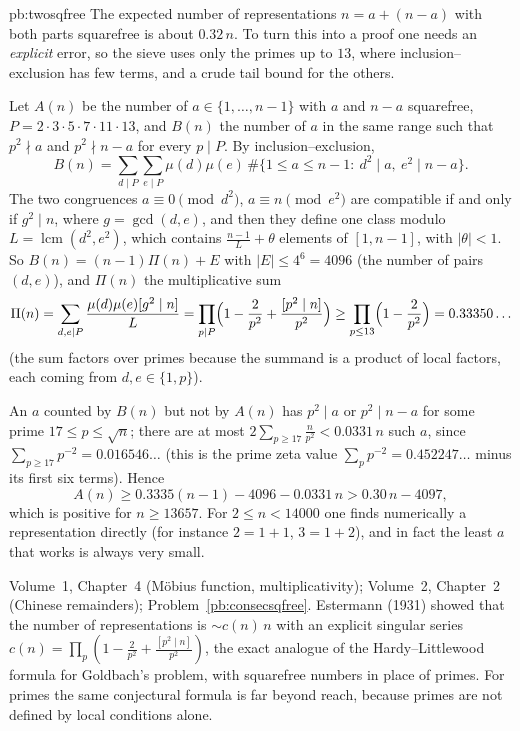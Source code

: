 \begin{solution}{pb:twosqfree}
\idea The expected number of representations $n=a+(n-a)$ with both parts squarefree is about $0.32\,n$. To turn this into a
proof one needs an \emph{explicit} error, so the sieve uses only the primes up to $13$, where inclusion--exclusion has few terms,
and a crude tail bound for the others.

\writeup Let $A(n)$ be the number of $a\in\{1,\dots,n-1\}$ with $a$ and $n-a$ squarefree, $P=2\cdot3\cdot5\cdot7\cdot11\cdot13$, and
$B(n)$ the number of $a$ in the same range such that $p^2\nmid a$ and $p^2\nmid n-a$ for every $p\mid P$. By inclusion--exclusion,
\[
B(n)=\sum_{d\mid P}\sum_{e\mid P}\mu(d)\mu(e)\,\#\{1\le a\le n-1:\ d^2\mid a,\ e^2\mid n-a\}.
\]
The two congruences $a\equiv0\pmod{d^2}$, $a\equiv n\pmod{e^2}$ are compatible if and only if $g^2\mid n$, where $g=\gcd(d,e)$, and
then they define one class modulo $L=\operatorname{lcm}(d^2,e^2)$, which contains $\frac{n-1}L+\theta$ elements of $[1,n-1]$, with
$|\theta|<1$. So $B(n)=(n-1)\Pi(n)+E$ with $|E|\le4^6=4096$ (the number of pairs $(d,e)$), and $\Pi(n)$ the multiplicative sum
\[
\Pi(n)=\sum_{d,e\mid P}\frac{\mu(d)\mu(e)[g^2\mid n]}L=\prod_{p\mid P}\Bigl(1-\frac2{p^2}+\frac{[p^2\mid n]}{p^2}\Bigr)\ge\prod_{p\le13}\Bigl(1-\frac2{p^2}\Bigr)=0.33350\ldots
\]
(the sum factors over primes because the summand is a product of local factors, each coming from $d,e\in\{1,p\}$).

An $a$ counted by $B(n)$ but not by $A(n)$ has $p^2\mid a$ or $p^2\mid n-a$ for some prime $17\le p\le\sqrt n$; there are at most
$2\sum_{p\ge17}\frac n{p^2}<0.0331\,n$ such $a$, since $\sum_{p\ge17}p^{-2}=0.016546\ldots$ (this is the prime zeta value
$\sum_pp^{-2}=0.452247\ldots$ minus its first six terms). Hence
\[
A(n)\ge0.3335(n-1)-4096-0.0331\,n>0.30\,n-4097,
\]
which is positive for $n\ge13657$. For $2\le n<14000$ one finds numerically a representation directly (for instance $2=1+1$, $3=1+2$),
and in fact the least $a$ that works is always very small.

\tools Volume~1, Chapter~4 (Möbius function, multiplicativity); Volume~2, Chapter~2 (Chinese remainders); Problem~\ref{pb:consecsqfree}.
\leads Estermann (1931) showed that the number of representations is $\sim c(n)\,n$ with an explicit singular series
$c(n)=\prod_p(1-\frac2{p^2}+\frac{[p^2\mid n]}{p^2})$, the exact analogue of the Hardy--Littlewood formula for Goldbach's problem,
with squarefree numbers in place of primes. For primes the same conjectural formula is far beyond reach, because primes are
not defined by local conditions alone.
\end{solution}

